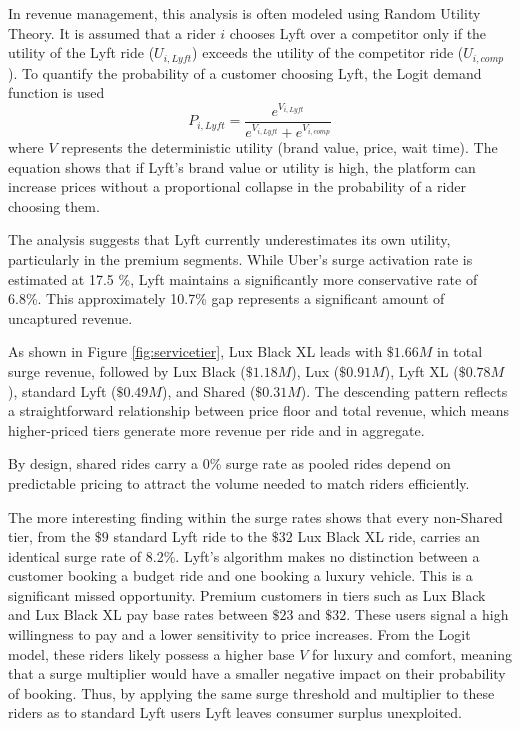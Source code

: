 \documentclass[11pt, letterpaper]{article}
\begin{document}
In revenue management, this analysis is often modeled using Random Utility Theory. It is assumed that a rider $i$ chooses Lyft over a competitor only if the utility of the Lyft ride ($U_{i,Lyft}$) exceeds the utility of the competitor ride ($U_{i,comp}$). To quantify the probability of a customer choosing Lyft, the Logit demand function is used
\begin{equation}
    P_{i,Lyft} = \frac{e^{V_{i,Lyft}}}{e^{V_{i,Lyft}} + e^{V_{i,comp}}}
\end{equation}
where $V$ represents the deterministic utility (brand value, price, wait time). The equation shows that if Lyft's brand value or utility is high, the platform can increase prices without a proportional collapse in the probability of a rider choosing them.

The analysis suggests that Lyft currently underestimates its own utility, particularly in the premium segments. While Uber's surge activation rate is estimated at 17.5 \%, Lyft maintains a significantly more conservative rate of 6.8\%. This approximately 10.7\% gap represents a significant amount of uncaptured revenue.

As shown in Figure \ref{fig:servicetier}, Lux Black XL leads with $\$1.66M$ in total surge revenue, followed by Lux Black ($\$1.18M$), Lux ($\$0.91M$), Lyft XL ($\$0.78M$), standard Lyft ($\$0.49M$), and Shared ($\$0.31M$). The descending pattern reflects a straightforward relationship between price floor and total revenue, which means higher-priced tiers generate more revenue per ride and in aggregate.

By design, shared rides carry a 0\% surge rate as pooled rides depend on predictable pricing to attract the volume needed to match riders efficiently.

The more interesting finding within the surge rates shows that every non-Shared tier, from the $\$9$ standard Lyft ride to the $\$32$ Lux Black XL ride, carries an identical surge rate of 8.2\%. Lyft's algorithm makes no distinction between a customer booking a budget ride and one booking a luxury vehicle. This is a significant missed opportunity. 
Premium customers in tiers such as Lux Black and Lux Black XL pay base rates between $\$23$ and $\$32$. These users signal a high willingness to pay and a lower sensitivity to price increases. From the Logit model, these riders likely possess a higher base $V$ for luxury and comfort, meaning that a surge multiplier would have a smaller negative impact on their probability of booking. Thus, by applying the same surge threshold and multiplier to these riders as to standard Lyft users Lyft leaves consumer surplus unexploited.
\end{document}
